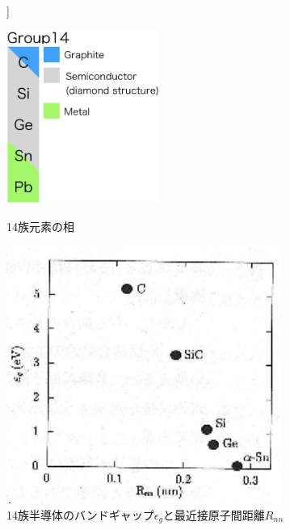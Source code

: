 \begin{figure}[htb]]
 \begin{minipage}{0.4\hsize}
  \begin{center}
   \includegraphics[width=50mm]{Introduction/group14.eps}
  \end{center}
  \caption{14族元素の相}
  \label{fig:group14}
 \end{minipage}
 \begin{minipage}{0.6\hsize}
  \begin{center}
   \includegraphics[width=90mm]{Introduction/bandgaps.eps}
  \end{center}
  \caption{14族半導体のバンドギャップ$\epsilon_g$と最近接原子間距離$R_{nn}$\cite{Yonezawa}}
  \label{fig:bandgaps}
 \end{minipage}
\end{figure}

